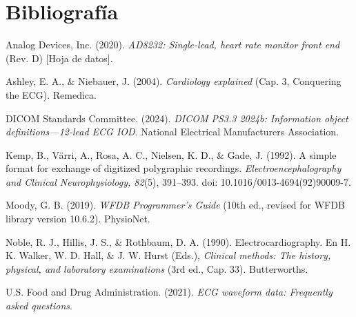 \documentclass[12pt,a4paper]{article}
\begin{document}

\clearpage
\section*{Bibliografía}

\newcommand{\aparef}[1]{%
    \par
    \noindent
    \hangindent=1.27cm
    #1
    \par
    \vspace{0.7em}
}

\aparef{
Analog Devices, Inc. (2020).
\textit{AD8232: Single-lead, heart rate monitor front end}
(Rev. D) [Hoja de datos].
}

\aparef{
Ashley, E. A., \& Niebauer, J. (2004).
\textit{Cardiology explained} (Cap. 3, Conquering the ECG).
Remedica.
}

\aparef{
DICOM Standards Committee. (2024).
\textit{DICOM PS3.3 2024b: Information object definitions---12-lead ECG IOD}.
National Electrical Manufacturers Association.
}

\aparef{
Kemp, B., Värri, A., Rosa, A. C., Nielsen, K. D., \& Gade, J. (1992).
A simple format for exchange of digitized polygraphic recordings.
\textit{Electroencephalography and Clinical Neurophysiology, 82}(5),
391--393.
doi: 10.1016/0013-4694(92)90009-7.
}

\aparef{
Moody, G. B. (2019).
\textit{WFDB Programmer's Guide}
(10th ed., revised for WFDB library version 10.6.2).
PhysioNet.
}

\aparef{
Noble, R. J., Hillis, J. S., \& Rothbaum, D. A. (1990).
Electrocardiography. En H. K. Walker, W. D. Hall, \& J. W. Hurst
(Eds.), \textit{Clinical methods: The history, physical, and laboratory
examinations} (3rd ed., Cap. 33). Butterworths.
}

\aparef{
U.S. Food and Drug Administration. (2021).
\textit{ECG waveform data: Frequently asked questions}.
}
\end{document}
